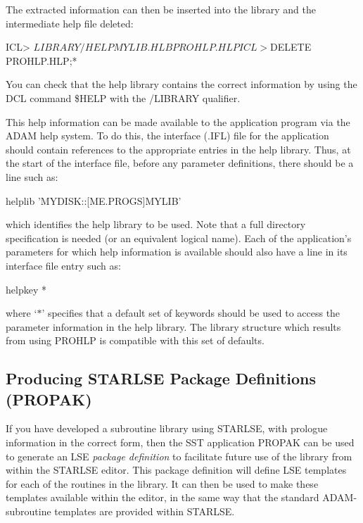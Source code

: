 \documentclass[twoside,11pt,nolof]{starlink}
\begin{document}
The extracted information can then be inserted into the library and the
intermediate help file deleted:

\begin{terminalv}
ICL> $LIBRARY/HELP MYLIB.HLB PROHLP.HLP
ICL> $DELETE PROHLP.HLP;*
\end{terminalv}

You can check that the help library contains the correct information by using
the DCL command \$HELP with the /LIBRARY qualifier.

This help information can be made available to the application program via
the ADAM help system.
To do this, the interface (.IFL) file for the application should contain
references to the appropriate entries in the help library.
Thus, at the start of the interface file, before any parameter definitions,
there should be a line such as:

\begin{terminalv}
helplib 'MYDISK::[ME.PROGS]MYLIB'
\end{terminalv}

which identifies the help library to be used.
Note that a full directory specification is needed (or an equivalent logical
name).
Each of the application's parameters for which help information is available
should also have a line in its interface file entry such as:

\begin{terminalv}
helpkey *
\end{terminalv}

where `$*$' specifies that a default set of keywords should be used to
access the parameter information in the help library.
The library structure which results from using PROHLP is compatible with
this set of defaults.


\subsection{Producing STARLSE Package Definitions (PROPAK)}
\label{sect:propak}

If you have developed a subroutine library using STARLSE, with prologue
information in the correct form, then the SST application PROPAK can be used
to generate an LSE \emph{package definition} to facilitate future use of the
library from within the STARLSE editor.
This package definition will define LSE templates for each of the routines
in the library.
It can then be used to make these templates available within the editor, in
the same way that the standard ADAM-subroutine templates are provided within
STARLSE.
\end{document}
